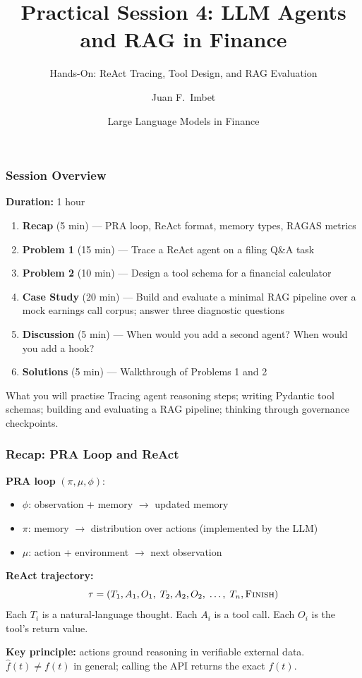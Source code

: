 \documentclass[9pt,t]{beamer}
\title{Practical Session 4: LLM Agents and RAG in Finance}
\subtitle{Hands-On: ReAct Tracing, Tool Design, and RAG Evaluation}
\author{Juan F.\ Imbet}
\institute{Paris Dauphine -- PSL University}
\date{Large Language Models in Finance}
\begin{document}
\begin{frame}
\frametitle{}
\titlepage
\end{frame}

\begin{frame}
\frametitle{Session Overview}

\textbf{Duration:} 1 hour

\medskip
\begin{enumerate}
  \item \textbf{Recap} (5 min) --- PRA loop, ReAct format, memory types, RAGAS metrics
  \item \textbf{Problem 1} (15 min) --- Trace a ReAct agent on a filing Q\&A task
  \item \textbf{Problem 2} (10 min) --- Design a tool schema for a financial calculator
  \item \textbf{Case Study} (20 min) --- Build and evaluate a minimal RAG pipeline over
        a mock earnings call corpus; answer three diagnostic questions
  \item \textbf{Discussion} (5 min) --- When would you add a second agent? When would
        you add a hook?
  \item \textbf{Solutions} (5 min) --- Walkthrough of Problems 1 and 2
\end{enumerate}

\medskip
\begin{block}{What you will practise}
  Tracing agent reasoning steps; writing Pydantic tool schemas; building and evaluating
  a RAG pipeline; thinking through governance checkpoints.
\end{block}
\end{frame}

\begin{frame}
\frametitle{Recap: PRA Loop and ReAct}

\textbf{PRA loop} $(\pi, \mu, \phi)$:
\begin{itemize}
  \item $\phi$: observation + memory $\to$ updated memory
  \item $\pi$: memory $\to$ distribution over actions (implemented by the LLM)
  \item $\mu$: action + environment $\to$ next observation
\end{itemize}

\medskip
\textbf{ReAct trajectory:}
\[
  \tau = (T_1, A_1, O_1,\; T_2, A_2, O_2,\; \ldots,\; T_n, \textsc{Finish})
\]
Each $T_i$ is a natural-language thought. Each $A_i$ is a tool call.
Each $O_i$ is the tool's return value.

\medskip
\textbf{Key principle:} actions ground reasoning in verifiable external data.
$\hat{f}(t) \neq f(t)$ in general; calling the API returns the exact $f(t)$.
\end{frame}
\end{document}
